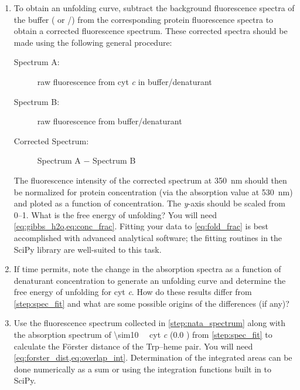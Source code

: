 \begin{enumerate}
	\item To obtain an unfolding curve, subtract the background fluorescence spectra of the buffer ( or /) from the corresponding protein fluorescence spectra to obtain a corrected fluorescence spectrum. 
	These corrected spectra should be made using the following general procedure:
	\begin{description}
		\item [Spectrum A:] raw fluorescence from cyt \emph{c} in buffer/denaturant
		\item [Spectrum B:] raw fluorescence from buffer/denaturant
		\item [Corrected Spectrum:] Spectrum A \( - \) Spectrum B
	\end{description}
	The fluorescence intensity of the corrected spectrum at \SI{350}{\nm} should then be normalized for protein concentration (via the absorption value at \SI{530}{\nm}) and ploted as a function of  concentration. 
	The \emph{y}-axis should be scaled from \numrange{0}{1}. 
	What is the free energy of unfolding?
	You will need \cref{eq:gibbs_h2o,eq:conc_frac}. 
	Fitting your data to \cref{eq:fold_frac} is best accomplished with advanced analytical software; the fitting routines in the SciPy library are well-suited to this task. 
	\label{step:spec_fit}
	\item If time permits, note the change in the absorption spectra as a function of denaturant concentration to generate an unfolding curve and determine the free energy of unfolding for cyt \emph{c}. 
	How do these results differ from \cref{step:spec_fit} and what are some possible origins of the differences (if any)?
	\item Use the fluorescence spectrum collected in \cref{step:nata_spectrum} along with the absorption spectrum of \SI{\sim10}{\micro\Molar} cyt \emph{c} (\SI{0.0}{\Molar} ) from \cref{step:spec_fit} to calculate the Förster distance of the Trp--heme pair. 
	You will need \cref{eq:forster_dist,eq:overlap_int}.
	Determination of the integrated areas can be done numerically as a sum or using the integration functions built in to SciPy.
	\label{step:dist_calc}

\end{enumerate}
